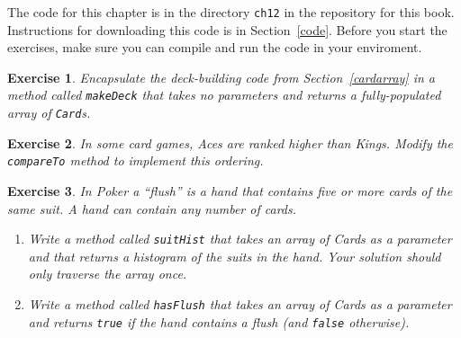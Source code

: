\documentclass[12pt]{book}
\theoremstyle{exercise}
\newtheorem{exercise}{Exercise}[chapter]
\newcommand{\java}[1]{\verb"#1"}
\newcommand{\java}[1]{\lstinline{#1}} %
\begin{document}
The code for this chapter is in the directory {\tt ch12} in the repository for this book.
Instructions for downloading this code is in Section~\ref{code}.
Before you start the exercises, make sure you can compile and run the code in your enviroment.


\begin{exercise}
Encapsulate the deck-building code from Section~\ref{cardarray} in a method called \java{makeDeck} that takes no parameters and returns a fully-populated array of \java{Card}s.
\end{exercise}


\begin{exercise}
In some card games, Aces are ranked higher than Kings.
Modify the \java{compareTo} method to implement this ordering.
\end{exercise}





\begin{exercise}
In Poker a ``flush'' is a hand that contains five or more cards of the same suit.
A hand can contain any number of cards.

\begin{enumerate}

\item Write a method called \java{suitHist} that takes an array of Cards as a parameter and that returns a histogram of the suits in the hand.
Your solution should only traverse the array once.

\item Write a method called \java{hasFlush} that takes an array of Cards as a parameter and returns \java{true} if the hand contains a flush (and \java{false} otherwise).

\end{enumerate}

\end{exercise}
\end{document}
